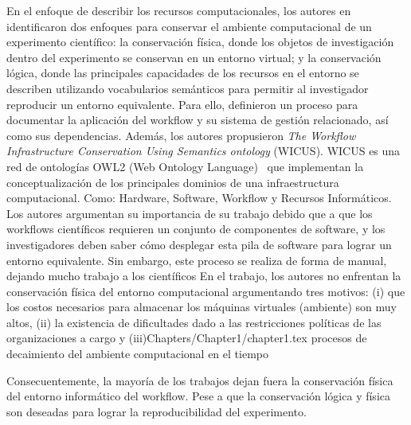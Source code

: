 En el enfoque de describir los recursos computacionales, los autores en \cite{santana2017reproducibility} identificaron dos enfoques para conservar el  ambiente computacional de un experimento científico: la conservación física, donde los objetos de investigación dentro del experimento se conservan en un entorno virtual; y la conservación lógica, donde las principales capacidades de los recursos en el entorno se describen utilizando vocabularios semánticos para permitir al investigador reproducir un entorno equivalente.
Para ello, definieron un proceso para documentar la aplicación del workflow y su sistema de gestión relacionado, así como sus dependencias.
Además, los autores propusieron \textit{The Workflow Infrastructure Conservation Using Semantics ontology} (WICUS). WICUS es una red de ontologías OWL2 (Web Ontology Language)~\cite{motik2009owl} que implementan la conceptualización de los principales dominios de una infraestructura computacional. Como: Hardware, Software, Workflow y Recursos Informáticos. 
Los autores argumentan su importancia de su trabajo debido que a que los workflows científicos requieren un conjunto de componentes de software, y los investigadores deben saber cómo desplegar esta pila de software para lograr un entorno equivalente.
Sin embargo, este proceso se realiza de forma de manual, dejando mucho trabajo a los científicos
En el trabajo, los autores no enfrentan la conservación física del entorno computacional argumentando tres motivos: (i) que los costos necesarios para almacenar los máquinas virtuales (ambiente) son muy altos, (ii) la existencia de dificultades dado a las restricciones políticas de las organizaciones a cargo y (iii)Chapters/Chapter1/chapter1.tex procesos de decaimiento del ambiente computacional en el tiempo~\cite{DBLP:journals/fgcs/DeelmanVJRCMMCS15}

Consecuentemente, la mayoría de los trabajos dejan fuera la conservación física del entorno informático del workflow. Pese a que la conservación lógica y física son deseadas para lograr la reproducibilidad del experimento.

